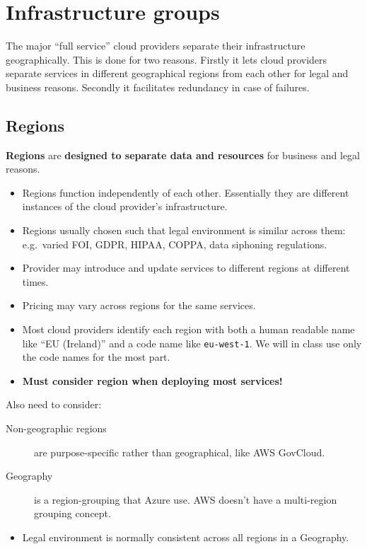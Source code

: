 \chapter{Infrastructure groups}
\label{ch:infrastructure-groups}


The major ``full service'' cloud providers separate their infrastructure
geographically. This is done for two reasons. Firstly it lets cloud
providers separate services in different geographical regions from each
other for legal and business reasons. Secondly it facilitates redundancy
in case of failures.

\section{Regions}
\label{sec:regions}

\textbf{Regions} are \textbf{designed to separate data and resources} for business and legal reasons.

\begin{itemize}
\item
  Regions function independently of each other. Essentially they are
  different instances of the cloud provider's infrastructure.
\item
  Regions usually chosen such that legal environment is similar across
  them: e.g.~varied FOI, GDPR, HIPAA, COPPA, data siphoning regulations.
\item
  Provider may introduce and update services to different regions at
  different times.
\item
  Pricing may vary across regions for the same services.
\item
  Most cloud providers identify each region with both a human readable
  name like ``EU (Ireland)'' and a code name like \texttt{eu-west-1}. We
  will in class use only the code names for the most part.
\item
  \textbf{Must consider region when deploying most services!}
\end{itemize}
Also need to consider:
\begin{description}
\item[Non-geographic regions]
are purpose-specific rather than geographical, like AWS GovCloud.
\item[Geography]
is a region-grouping that Azure use. AWS doesn't have a multi-region
grouping concept.
\end{description}
\begin{itemize}
\item
  Legal environment is normally consistent across all regions in a
  Geography.
\end{itemize}

